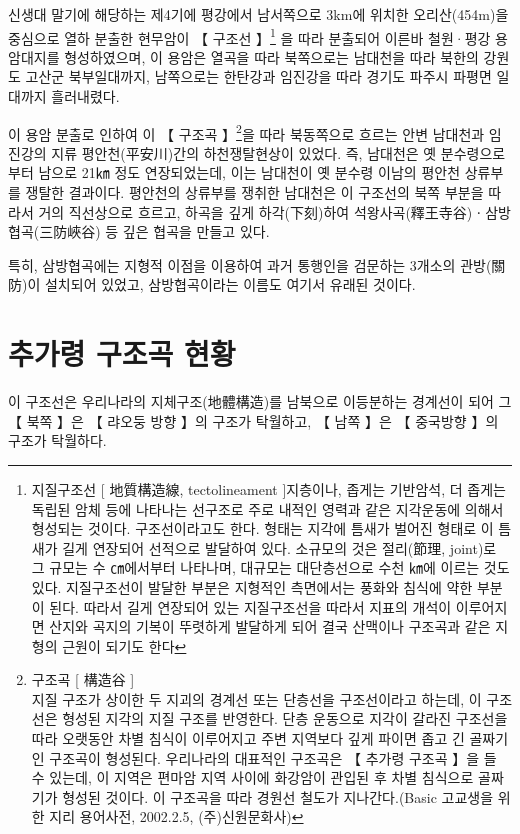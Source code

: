 \documentclass[12pt,a4paper]{book}
\newcommand{\SectionMargin}			{\newpage  \null \vskip 0cm}
\begin{document}
신생대 말기에 해당하는 제4기에 평강에서 남서쪽으로 3km에 위치한 오리산(454m)을 중심으로 열하 분출한 현무암이 【 구조선 】\footnote{지질구조선 [ 地質構造線, tectolineament ]지층이나, 좁게는 기반암석, 더 좁게는 독립된 암체 등에 나타나는 선구조로 주로 내적인 영력과 같은 지각운동에 의해서 형성되는 것이다. 구조선이라고도 한다. 형태는 지각에 틈새가 벌어진 형태로 이 틈새가 길게 연장되어 선적으로 발달하여 있다. 소규모의 것은 절리(節理, joint)로 그 규모는 수 ㎝에서부터 나타나며, 대규모는 대단층선으로 수천 ㎞에 이르는 것도 있다. 지질구조선이 발달한 부분은 지형적인 측면에서는 풍화와 침식에 약한 부분이 된다. 따라서 길게 연장되어 있는 지질구조선을 따라서 지표의 개석이 이루어지면 산지와 곡지의 기복이 뚜렷하게 발달하게 되어 결국 산맥이나 구조곡과 같은 지형의 근원이 되기도 한다} 을 따라 분출되어 이른바 철원·평강 용암대지를 형성하였으며, 이 용암은 열곡을 따라 북쪽으로는 남대천을 따라 북한의 강원도 고산군 북부일대까지, 남쪽으로는 한탄강과 임진강을 따라 경기도 파주시 파평면 일대까지 흘러내렸다.

이 용암 분출로 인하여 이 【 구조곡 】\footnote{구조곡 [ 構造谷 ]\\ 지질 구조가 상이한 두 지괴의 경계선 또는 단층선을 구조선이라고 하는데, 이 구조선은 형성된 지각의 지질 구조를 반영한다. 단층 운동으로 지각이 갈라진 구조선을 따라 오랫동안 차별 침식이 이루어지고 주변 지역보다 깊게 파이면 좁고 긴 골짜기인 구조곡이 형성된다. 우리나라의 대표적인 구조곡은 【 추가령 구조곡 】을 들 수 있는데, 이 지역은 편마암 지역 사이에 화강암이 관입된 후 차별 침식으로 골짜기가 형성된 것이다. 이 구조곡을 따라 경원선 철도가 지나간다.(Basic 고교생을 위한 지리 용어사전, 2002.2.5, (주)신원문화사)}을 따라 북동쪽으로 흐르는 안변 남대천과 임진강의 지류 평안천(平安川)간의 하천쟁탈현상이 있었다. 즉, 남대천은 옛 분수령으로부터 남으로 21㎞ 정도 연장되었는데, 이는 남대천이 옛 분수령 이남의 평안천 상류부를 쟁탈한 결과이다. 평안천의 상류부를 쟁취한 남대천은 이 구조선의 북쪽 부분을 따라서 거의 직선상으로 흐르고, 하곡을 깊게 하각(下刻)하여 석왕사곡(釋王寺谷)ㆍ삼방협곡(三防峽谷) 등 깊은 협곡을 만들고 있다.

특히, 삼방협곡에는 지형적 이점을 이용하여 과거 통행인을 검문하는 3개소의 관방(關防)이 설치되어 있었고, 삼방협곡이라는 이름도 여기서 유래된 것이다.




	\SectionMargin
	\section{추가령 구조곡  현황}

			이 구조선은 우리나라의 지체구조(地體構造)를 남북으로 이등분하는 경계선이 되어 
			그 【 북쪽 】은 【 랴오둥 방향 】의 구조가 탁월하고, 【 남쪽 】은 【 중국방향 】의 구조가 탁월하다. 
\end{document}
